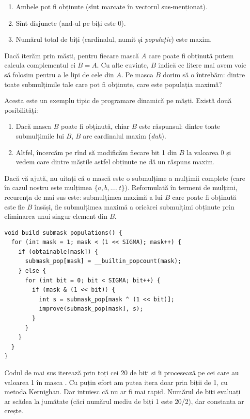 \begin{enumerate}
  \item Ambele pot fi obținute (sînt marcate în vectorul sus-menționat).
  \item Sînt disjuncte (and-ul pe biți este 0).
  \item Numărul  total de biți (cardinalul, numit și \textit{populație}) este maxim.
\end{enumerate}

Dacă iterăm prin măști, pentru fiecare mască $A$ care poate fi obținută putem calcula complementul ei $B = \bar{A}$. Cu alte cuvinte, $B$ indică ce litere mai avem voie să folosim pentru a le lipi de cele din $A$. Pe masca $B$ dorim să o întrebăm: dintre toate submulțimile tale care pot fi obținute, care este populația maximă?

Acesta este un exemplu tipic de programare dinamică pe măști. Există două posibilități:

\begin{enumerate}
  \item Dacă masca $B$ poate fi obținută, chiar $B$ este răspunsul: dintre toate submulțimile lui $B$, $B$ are cardinalul maxim (\textit{duh}).

  \item Altfel, încercăm pe rînd să modificăm fiecare bit 1 din $B$ la valoarea 0 și vedem care dintre măștile astfel obținute ne dă un răspuns maxim.
\end{enumerate}

Dacă vă ajută, nu uitați că o mască este o submulțime a mulțimii complete (care în cazul nostru este mulțimea $\{a, b, \dots, t\}$). Reformulată în termeni de mulțimi, recurența de mai sus este: submulțimea maximă a lui $B$ care poate fi obținută este fie $B$ însăși, fie submulțimea maximă a oricărei submulțimi obținute prin eliminarea unui singur element din $B$.

\begin{verbatim}
void build_submask_populations() {
  for (int mask = 1; mask < (1 << SIGMA); mask++) {
    if (obtainable[mask]) {
      submask_pop[mask] = __builtin_popcount(mask);
    } else {
      for (int bit = 0; bit < SIGMA; bit++) {
        if (mask & (1 << bit)) {
          int s = submask_pop[mask ^ (1 << bit)];
          improve(submask_pop[mask], s);
        }
      }
    }
  }
}
\end{verbatim}

Codul de mai sus iterează prin toți cei 20 de biți și îi procesează pe cei care au valoarea 1 în masca . Cu puțin efort am putea itera doar prin biții de 1, cu metoda Kernighan. Dar intuiesc că nu ar fi mai rapid. Numărul de biți evaluați ar scădea la jumătate (căci numărul mediu de biți 1 este 20/2), dar constanta ar crește.

